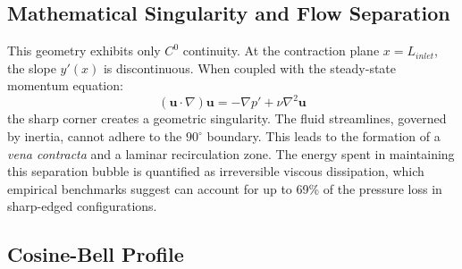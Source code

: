 \documentclass[12pt, a4paper]{article}
\begin{document}
\subsection{Mathematical Singularity and Flow Separation}
This geometry exhibits only $C^0$ continuity. At the contraction plane $x = L_{inlet}$, the slope $y'(x)$ is discontinuous. When coupled with the steady-state momentum equation:
\begin{equation}
	(\mathbf{u} \cdot \nabla) \mathbf{u} = -\nabla p' + \nu \nabla^2 \mathbf{u}
\end{equation}
the sharp corner creates a geometric singularity. The fluid streamlines, governed by inertia, cannot adhere to the $90^{\circ}$ boundary. This leads to the formation of a \textit{vena contracta} and a laminar recirculation zone. The energy spent in maintaining this separation bubble is quantified as irreversible viscous dissipation, which empirical benchmarks suggest can account for up to 69\% of the pressure loss\cite{idelchik2007} in sharp-edged configurations.

\subsection{Cosine-Bell Profile}
\end{document}
